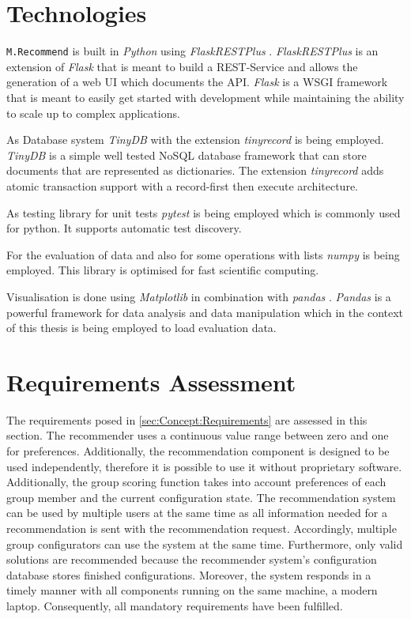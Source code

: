 

\section{Technologies}
\label{sec:DesignImplementation:Technologies}

\texttt{M.Recommend} is built in \emph{Python} \cite{PythonOrg} using \emph{FlaskRESTPlus} \cite{FlaskRESTPlus13Documentation}. \emph{FlaskRESTPlus} is an extension of \emph{Flask} \cite{FlaskDocumentation} that is meant to build a REST-Service and allows the generation of a web UI which documents the API. \emph{Flask} is a WSGI \cite{WhatWSGI} framework that is meant to easily get started with development while maintaining the ability to scale up to complex applications.

As Database system \emph{TinyDB} \cite{TinyDB15Documentation} with the extension \emph{tinyrecord} \cite{junEugeneeeoTinyrecord2020} is being employed. \emph{TinyDB} is a simple well tested NoSQL database framework that can store documents that are represented as dictionaries. The extension \emph{tinyrecord} adds atomic transaction support with a record-first then execute architecture.

As testing library for unit tests \emph{pytest} \cite{PytestDocumentation} is being employed which is commonly used for python. It supports automatic test discovery.

For the evaluation of data and also for some operations with lists \emph{numpy} \cite{NumPy} is being employed. This library is optimised for fast scientific computing. 

Visualisation is done using \emph{Matplotlib} \cite{MatplotlibDocumentation} in combination with \emph{pandas} \cite{PandasPythonData}. \emph{Pandas} is a powerful framework for data analysis and data manipulation which in the context of this thesis is being employed to load evaluation data.


\section{Requirements Assessment}
\label{sec:DesignImplementation:RequirementsAssesment}

The requirements posed in \autoref{sec:Concept:Requirements} are assessed in this section. The recommender uses a continuous value range between zero and one for preferences. Additionally, the recommendation component is designed to be used independently, therefore it is possible to use it without proprietary software.
Additionally, the group scoring function takes into account preferences of each group member and the current configuration state. The recommendation system can be used by multiple users at the same time as all information needed for a recommendation is sent with the recommendation request. Accordingly, multiple group configurators can use the system at the same time. Furthermore, only valid solutions are recommended because the recommender system's configuration database stores finished configurations. Moreover, the system responds in a timely manner with all components running on the same machine, a modern laptop.
Consequently, all mandatory requirements have been fulfilled.

